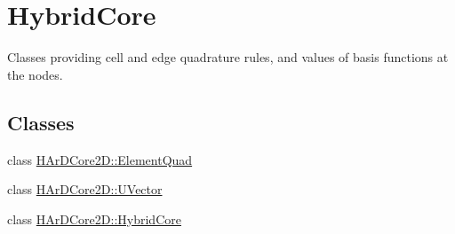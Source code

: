 \hypertarget{group__HybridCore}{}\section{Hybrid\+Core}
\label{group__HybridCore}


Classes providing cell and edge quadrature rules, and values of basis functions at the nodes.  


\subsection*{Classes}
\begin{DoxyCompactItemize}
\item 
class \hyperlink{classHArDCore2D_1_1ElementQuad}{H\+Ar\+D\+Core2\+D\+::\+Element\+Quad}
\item 
class \hyperlink{classHArDCore2D_1_1UVector}{H\+Ar\+D\+Core2\+D\+::\+U\+Vector}
\item 
class \hyperlink{classHArDCore2D_1_1HybridCore}{H\+Ar\+D\+Core2\+D\+::\+Hybrid\+Core}
\end{DoxyCompactItemize}
